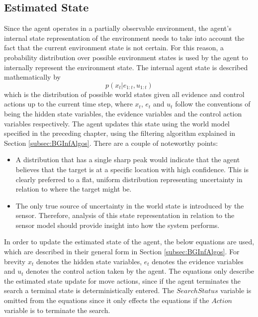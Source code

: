 \subsection{Estimated State}
\workinprogress
Since the agent operates in a partially observable environment, the agent's internal state representation of the environment needs to take into account the fact that the current environment state is not certain. For this reason, a probability distribution over possible environment states is used by the agent to internally represent the environment state. The internal agent state is described mathematically by 
\[p(x_t | e_{1:t}, u_{1:t})\]
which is the distribution of possible world states given all evidence and control actions up to the current time step, where $x_t$, $e_t$ and $u_t$ follow the conventions of being the hidden state variables, the evidence variables and the control action variables respectively. The agent updates this state using the world model specified in the preceding chapter, using the filtering algorithm explained in Section \ref{subsec:BGInfAlgos}. There are a couple of noteworthy points:
\begin{itemize}
    \item A distribution that has a single sharp peak would indicate that the agent believes that the target is at a specific location with high confidence. This is clearly preferred to a flat, uniform distribution representing uncertainty in relation to where the target might be.
    \item The only true source of uncertainty in the world state is introduced by the sensor. Therefore, analysis of this state representation in relation to the sensor model should provide insight into how the system performs.
\end{itemize}
\par In order to update the estimated state of the agent, the below equations are used, which are described in their general form in Section \ref{subsec:BGInfAlgos}. For brevity $x_t$ denotes the hidden state variables, $e_t$ denotes the evidence variables and $u_t$ denotes the control action taken by the agent. The equations only describe the estimated state update for move actions, since if the agent terminates the search a terminal state is deterministically entered. The $SearchStatus$ variable is omitted from the equations since it only effects the equations if the $Action$ variable is to terminate the search.
\scriptsize
